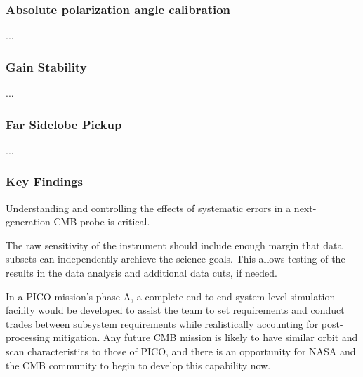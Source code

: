 \documentclass[PICOReport.tex]{subfiles}
\begin{document}
\subsubsection{Absolute polarization angle calibration}
\label{sec:angle}
...

\subsubsection{Gain Stability}
\label{sec:gain}
...

\subsubsection{Far Sidelobe Pickup}
\label{sec:fsl}
...

\subsubsection{Key Findings}
Understanding and controlling the effects of systematic errors in a
next-generation CMB probe is critical.

The raw sensitivity of the instrument should include enough margin
that data subsets can independently archieve the science goals.
This allows testing of the results in the data analysis and additional
data cuts, if needed.

In a PICO mission's phase A, a complete end-to-end system-level
simulation facility would be developed to assist the team to set
requirements and conduct trades between subsystem requirements while
realistically accounting for post-processing mitigation.  Any future
CMB mission is likely to have similar orbit  
and scan characteristics to those of PICO, and there is an opportunity for NASA and
the CMB community to begin to develop this capability now.
\end{document}
